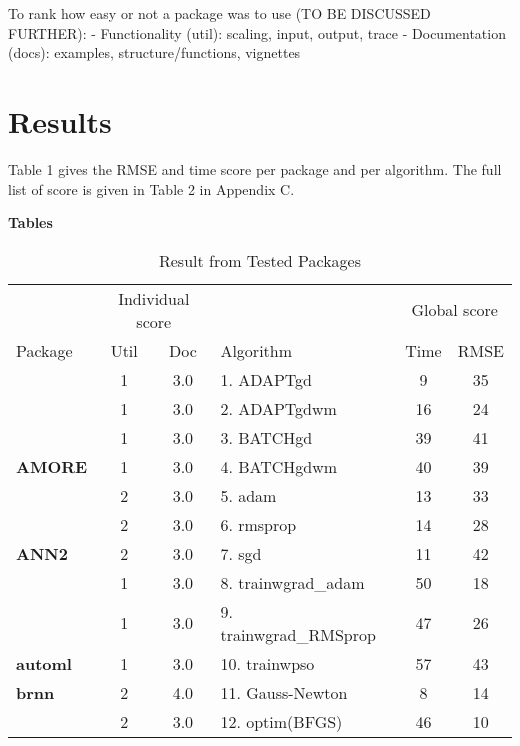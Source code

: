 To rank how easy or not a package was to use (TO BE DISCUSSED FURTHER):
- Functionality (util): scaling, input, output, trace - Documentation
(docs): examples, structure/functions, vignettes

\hypertarget{results}{%
\section{Results}\label{results}}

Table 1 gives the RMSE and time score per package and per algorithm. The
full list of score is given in Table 2 in Appendix C.

\textbf{Tables}

\begin{Schunk}
\begin{table}

\caption{\label{tab:unnamed-chunk-2}Result from Tested Packages}
\centering
\fontsize{7}{9}\selectfont
\begin{tabular}[t]{>{}lcclcc}
\toprule
\multicolumn{1}{c}{ } & \multicolumn{2}{c}{Individual score} & \multicolumn{1}{c}{ } & \multicolumn{2}{c}{Global score} \\
\cmidrule(l{3pt}r{3pt}){2-3} \cmidrule(l{3pt}r{3pt}){5-6}
Package & Util & Doc & Algorithm & Time & RMSE\\
\midrule
 & 1 & 3.0 & 1. ADAPTgd & 9 & 35\\

 & 1 & 3.0 & 2. ADAPTgdwm & 16 & 24\\

 & 1 & 3.0 & 3. BATCHgd & 39 & 41\\

\multirow{-4}{*}{\raggedright\arraybackslash \textbf{AMORE}} & 1 & 3.0 & 4. BATCHgdwm & 40 & 39\\
\cmidrule{1-6}
 & 2 & 3.0 & 5. adam & 13 & 33\\

 & 2 & 3.0 & 6. rmsprop & 14 & 28\\

\multirow{-3}{*}{\raggedright\arraybackslash \textbf{ANN2}} & 2 & 3.0 & 7. sgd & 11 & 42\\
\cmidrule{1-6}
 & 1 & 3.0 & 8. trainwgrad\_adam & 50 & 18\\

 & 1 & 3.0 & 9. trainwgrad\_RMSprop & 47 & 26\\

\multirow{-3}{*}{\raggedright\arraybackslash \textbf{automl}} & 1 & 3.0 & 10. trainwpso & 57 & 43\\
\cmidrule{1-6}
\textbf{brnn} & 2 & 4.0 & 11. Gauss-Newton & 8 & 14\\
\cmidrule{1-6}
 & 2 & 3.0 & 12. optim(BFGS) & 46 & 10\\


\end{tabular}
\end{table}
\end{Schunk}
